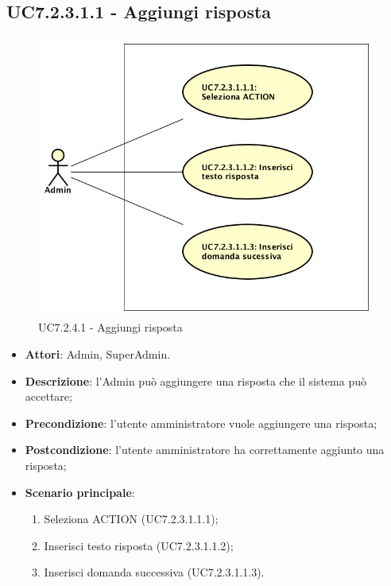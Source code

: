 \documentclass[../AnalisiDeiRequisiti_v4.0.0.tex]{subfiles}
\begin{document}
\subsection{UC7.2.3.1.1 - Aggiungi risposta} 
\label{sssec:UC7.2.3.1.1} 
\begin{figure}[!h]
	\centering
	\includegraphics[scale=0.7]{UseCases/UC7_GestionePannelloAdmin/UC7_2_GestioneDomande/UC7_2_3_ModificaDomanda/UC7_2_3_1_GestioneRisposte/UC7_2_3_1_1_AggiungiRisposta/UC7_2_3_1_1_AggiungiRisposta.png}
	\caption{UC7.2.4.1 - Aggiungi risposta}
\end{figure}
\begin{itemize} 
\item \textbf{Attori}: Admin, SuperAdmin.
\item \textbf{Descrizione}: l'Admin può aggiungere una risposta che il sistema può accettare;
\item \textbf{Precondizione}: l'utente amministratore vuole aggiungere una risposta;
\item \textbf{Postcondizione}: l'utente amministratore ha correttamente aggiunto una risposta;
\item \textbf{Scenario principale}: \begin{enumerate}\item Seleziona ACTION (UC7.2.3.1.1.1);\item Inserisci testo risposta (UC7.2.3.1.1.2);\item Inserisci domanda successiva (UC7.2.3.1.1.3).
\end{enumerate}
\end{itemize}  
\end{document}
